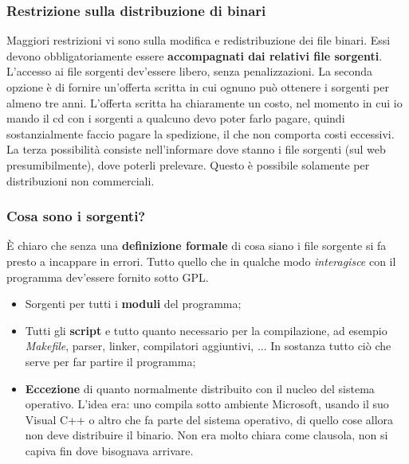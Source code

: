 \subsubsection{Restrizione sulla distribuzione di binari}

Maggiori restrizioni vi sono sulla modifica e redistribuzione dei file binari. Essi devono obbligatoriamente essere \textbf{accompagnati dai relativi file sorgenti}. L'accesso ai file sorgenti dev'essere libero, senza penalizzazioni. La seconda opzione è di fornire un'offerta scritta in cui ognuno può ottenere i sorgenti per almeno tre anni. L'offerta scritta ha chiaramente un costo, nel momento in cui io mando il cd con i sorgenti a qualcuno devo poter farlo pagare, quindi sostanzialmente faccio pagare la spedizione, il che non comporta costi eccessivi. La terza possibilità consiste nell'informare dove stanno i file sorgenti (sul web presumibilmente), dove poterli prelevare. Questo è possibile solamente per distribuzioni non commerciali.  

\subsubsection{Cosa sono i sorgenti?}

È chiaro che senza una \textbf{definizione formale} di cosa siano i file sorgente si fa presto a incappare in errori. Tutto quello che in qualche modo \textit{interagisce} con il programma dev'essere fornito sotto GPL. 

\begin{itemize}

\item Sorgenti per tutti i \textbf{moduli} del programma;

\item Tutti gli \textbf{script} e tutto quanto necessario per la compilazione, ad esempio \textit{Makefile}, parser, linker, compilatori aggiuntivi, ... In sostanza tutto ciò che serve per far partire il programma;

\item \textbf{Eccezione} di quanto normalmente distribuito con il nucleo del sistema operativo. L'idea era: uno compila sotto ambiente Microsoft, usando il suo Visual C++ o altro che fa parte del sistema operativo, di quello cose allora non deve distribuire il binario. Non era molto chiara come clausola, non si capiva fin dove bisognava arrivare.
 
\end{itemize}

